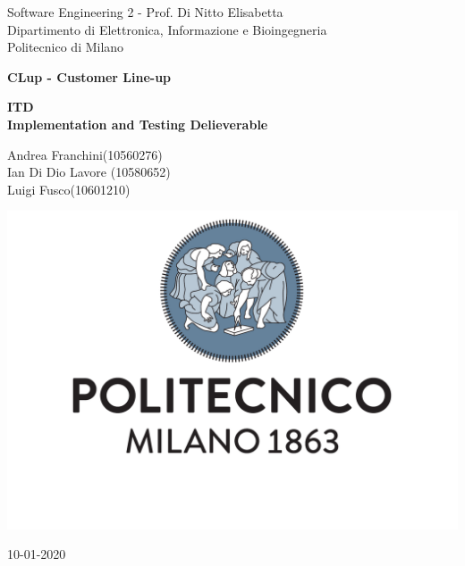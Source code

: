 \documentclass[
]{article}
\begin{document}
\begin{titlepage}
	\centering
    
    {\normalsize 
        Software Engineering 2 - Prof. Di Nitto Elisabetta \\ 
		Dipartimento di Elettronica, Informazione e Bioingegneria \\
        Politecnico di Milano \par
    }     \vspace{3cm}

    {\Huge \textbf{CLup - Customer Line-up\\} }    \vspace{1cm}
  
    {\large \textbf{ITD\\Implementation and Testing Delieverable} \par}     \vspace{4cm}

	{\normalsize Andrea Franchini(10560276) \\ Ian Di Dio Lavore (10580652)\\ Luigi Fusco(10601210)\par}     \vspace{3cm}

    \includegraphics[scale=0.4]{../DD/images/logo.pdf}
    \vspace{0.5cm}


	{\normalsize 10-01-2020 \par}
	
\end{titlepage}

\tableofcontents

\end{document}
